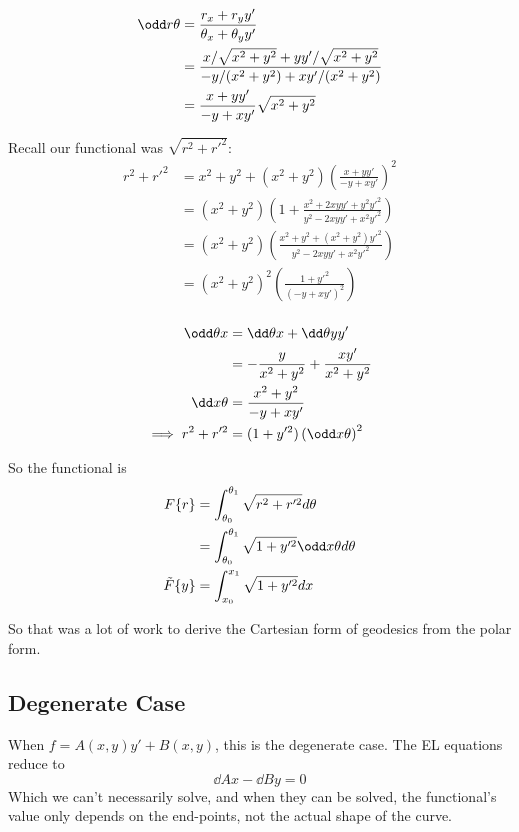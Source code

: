 \documentclass{X:/Documents/Coding/Latex/myassignment}
\begin{document}
\begin{align*}
	\odd r\theta &= \frac{r_x + r_y y'}{\theta_x + \theta_y y'} \\
	&= \frac{x/\sqrt{x^2+y^2} + y y' / \sqrt{x^2+y^2}}{-y/(x^2+y^2) + xy'/(x^2+y^2)}\\
	&= \frac{x + y y'}{- y + xy'} \sqrt{x^2+y^2}
\end{align*}

Recall our functional was $\sqrt{r^2 + r'^2}$:
\begin{align*}
	r^2 + r'^2 &= x^2 + y^2 + \left(x^2 + y^2\right)\left(\frac{x+yy'}{-y+xy'}\right)^2\\
	&= \left(x^2+y^2\right) \left(1 + \frac{x^2 + 2xyy' + y^2 y'^2}{y^2 - 2xyy' + x^2 y'^2}\right)\\
	&= \left(x^2+y^2\right) \left( \frac{x^2 +y^2 + (x^2+y^2) y'^2}{y^2 - 2xyy' + x^2 y'^2}\right)\\
	&= \left(x^2+y^2\right)^2 \left( \frac{1 + y'^2}{(-y+xy')^2}\right)\\
\end{align*}

\begin{align*}
	\odd \theta x &= \dd \theta x + \dd \theta y y'\\
	&= - \frac{y}{x^2+y^2} + \frac{xy'}{x^2+y^2}\\
	\dd x \theta &= \frac{x^2+ y^2}{-y+xy'}\\
	\implies r^2 + r'^2 &= (1+y'^2) \left(\odd x\theta\right)^2
\end{align*}

So the functional is
\begin{align*}
	F\{r\} &= \int_{\theta_0}^{\theta_1} \sqrt{r^2 + r'^2} d\theta\\
	&= \int_{\theta_0}^{\theta_1} \sqrt{1+y'^2} \odd x\theta d\theta \\
	\tilde{F}\{y\} &= \int_{x_0}^{x_1} \sqrt{1+y'^2} dx
\end{align*}

So that was a lot of work to derive the Cartesian form of geodesics from the polar form.




\subsection{Degenerate Case}
When $f = A(x,y)y' + B(x,y)$, this is the degenerate case.
The EL equations reduce to 
\[\dd Ax - \dd By = 0\]
Which we can't necessarily solve, and when they can be solved, the functional's value only depends on the end-points, not the actual shape of the curve.
\end{document}
